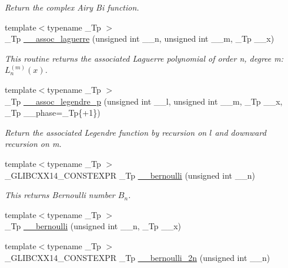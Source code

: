 \begin{DoxyCompactItemize}
\begin{DoxyCompactList}\small\item\em Return the complex Airy Bi function. \end{DoxyCompactList}\item 
{\footnotesize template$<$typename \+\_\+\+Tp $>$ }\\\+\_\+\+Tp \hyperlink{namespacestd_1_1____detail_a7d47c4512f7c6914f5504fde6ffa31fb}{\+\_\+\+\_\+assoc\+\_\+laguerre} (unsigned int \+\_\+\+\_\+n, unsigned int \+\_\+\+\_\+m, \+\_\+\+Tp \+\_\+\+\_\+x)
\begin{DoxyCompactList}\small\item\em This routine returns the associated Laguerre polynomial of order n, degree m\+: $ L_n^{(m)}(x) $. \end{DoxyCompactList}\item 
{\footnotesize template$<$typename \+\_\+\+Tp $>$ }\\\+\_\+\+Tp \hyperlink{namespacestd_1_1____detail_afd2b7e1cb349f144f5527f4f415bc324}{\+\_\+\+\_\+assoc\+\_\+legendre\+\_\+p} (unsigned int \+\_\+\+\_\+l, unsigned int \+\_\+\+\_\+m, \+\_\+\+Tp \+\_\+\+\_\+x, \+\_\+\+Tp \+\_\+\+\_\+phase=\+\_\+\+Tp\{+1\})
\begin{DoxyCompactList}\small\item\em Return the associated Legendre function by recursion on $ l $ and downward recursion on m. \end{DoxyCompactList}\item 
{\footnotesize template$<$typename \+\_\+\+Tp $>$ }\\\+\_\+\+G\+L\+I\+B\+C\+X\+X14\+\_\+\+C\+O\+N\+S\+T\+E\+X\+PR \+\_\+\+Tp \hyperlink{namespacestd_1_1____detail_a68ae2aecb4cdf37b72cd60409cdc500c}{\+\_\+\+\_\+bernoulli} (unsigned int \+\_\+\+\_\+n)
\begin{DoxyCompactList}\small\item\em This returns Bernoulli number $ B_n $. \end{DoxyCompactList}\item 
{\footnotesize template$<$typename \+\_\+\+Tp $>$ }\\\+\_\+\+Tp \hyperlink{namespacestd_1_1____detail_a1171e65b7fb7712f0181fe7288acb343}{\+\_\+\+\_\+bernoulli} (unsigned int \+\_\+\+\_\+n, \+\_\+\+Tp \+\_\+\+\_\+x)
\item 
{\footnotesize template$<$typename \+\_\+\+Tp $>$ }\\\+\_\+\+G\+L\+I\+B\+C\+X\+X14\+\_\+\+C\+O\+N\+S\+T\+E\+X\+PR \+\_\+\+Tp \hyperlink{namespacestd_1_1____detail_abd0b1f05f2b32a21cad034b38473bb8b}{\+\_\+\+\_\+bernoulli\+\_\+2n} (unsigned int \+\_\+\+\_\+n)

\end{DoxyCompactItemize}

